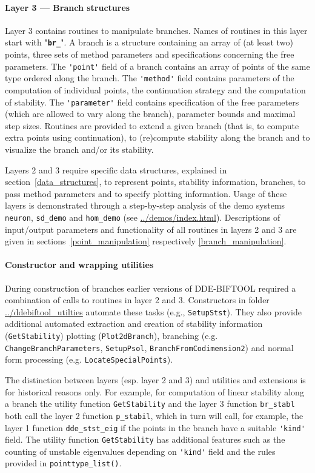 \documentclass[10pt]{scrartcl}
\newcommand{\DDEBIFCODE}{\textsc{DDE-BIFTOOL}}
\newcommand{\file}[1]{\textbf{\texttt{#1}}}
\newcommand{\demobase}{\url{../demos/index.html}}
\newcommand{\blist}[1]{\mbox{\lstinline!#1!}}
\begin{document}
\paragraph{Layer 3 --- Branch structures}
Layer 3 contains routines to manipulate branches.  Names of routines
in this layer start with "\file{br\_}". A branch is a structure
containing an array of (at least two) points, three sets of method
parameters and specifications concerning the free parameters.  The
\blist{'point'} field of a branch contains an array of points of the
same type ordered along the branch.  The \blist{'method'} field
contains parameters of the computation of individual points, the
continuation strategy and the computation of stability.  The
\blist{'parameter'} field contains specification of the free
parameters (which are allowed to vary along the branch), parameter
bounds and maximal step sizes.  Routines are provided to extend a
given branch (that is, to compute extra points using continuation), to
(re)compute stability along the branch and to visualize the branch
and/or its stability.

Layers 2 and 3 require specific data structures, explained in
section~\ref{data_structures}, to represent points, stability
information, branches, to pass method parameters and to specify
plotting information.  Usage of these layers is
demonstrated %
through a step-by-step analysis of the demo systems \texttt{neuron},
\texttt{sd\_demo} and \texttt{hom\_demo} (see
\demobase{}).  Descriptions of input/output parameters and
functionality of all routines in layers 2 and 3 are given in
sections~\ref{point_manipulation} respectively
\ref{branch_manipulation}.

\paragraph{Constructor and wrapping utilities}
During construction of branches earlier versions of \DDEBIFCODE{}
required a combination of calls to routines in layer 2 and
3. Constructors in folder \url{../ddebiftool_utilties} automate these
tasks (e.g., \blist{SetupStst}). They also provide additional
automated extraction and creation of stability information
(\blist{GetStability}) plotting (\blist{Plot2dBranch}), branching
(e.g. \blist{ChangeBranchParameters}, \blist{SetupPsol}, 
\blist{BranchFromCodimension2}) and normal form
processing (e.g. \blist{LocateSpecialPoints}).

The distinction between layers (esp. layer 2 and 3) and utilities and
extensions is for historical reasons only. For example, for
computation of linear stability along a branch the utility function
\blist{GetStability} and the layer 3 function \blist{br_stabl} both
call the layer 2 function \blist{p_stabil}, which in turn will call,
for example, the layer 1 function \blist{dde_stst_eig} if the points
in the branch have a suitable \blist{'kind'} field. The utility
function \blist{GetStability} has additional features such as the
counting of unstable eigenvalues depending on \blist{'kind'} field and
the rules provided in \blist{pointtype_list()}.
\end{document}
